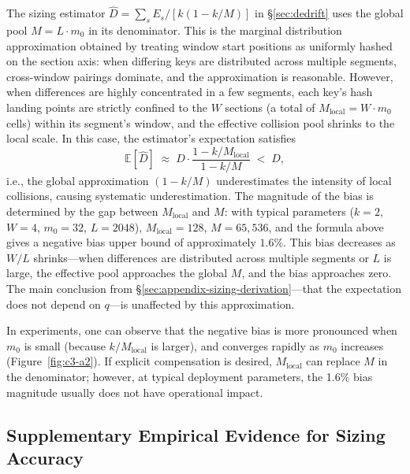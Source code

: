 The sizing estimator $\hat{D} = \sum_s E_s/[k(1-k/M)]$ in \S\ref{sec:dedrift} uses the global pool $M = L \cdot m_0$ in its denominator. This is the marginal distribution approximation obtained by treating window start positions as uniformly hashed on the section axis: when differing keys are distributed across multiple segments, cross-window pairings dominate, and the approximation is reasonable. However, when differences are highly concentrated in a few segments, each key's hash landing points are strictly confined to the $W$ sections (a total of $M_{\text{local}} = W \cdot m_0$ cells) within its segment's window, and the effective collision pool shrinks to the local scale. In this case, the estimator's expectation satisfies
\[
\mathbb{E}[\hat{D}] \;\approx\; D \cdot \frac{1 - k/M_{\text{local}}}{1 - k/M} \;<\; D,
\]
i.e., the global approximation $(1{-}k/M)$ underestimates the intensity of local collisions, causing systematic underestimation. The magnitude of the bias is determined by the gap between $M_{\text{local}}$ and $M$: with typical parameters ($k{=}2$, $W{=}4$, $m_0{=}32$, $L{=}2048$), $M_{\text{local}}{=}128$, $M{=}65{,}536$, and the formula above gives a negative bias upper bound of approximately $1.6\%$. This bias decreases as $W/L$ shrinks---when differences are distributed across multiple segments or $L$ is large, the effective pool approaches the global $M$, and the bias approaches zero. The main conclusion from \S\ref{sec:appendix-sizing-derivation}---that the expectation does not depend on $q$---is unaffected by this approximation.

In experiments, one can observe that the negative bias is more pronounced when $m_0$ is small (because $k/M_{\text{local}}$ is larger), and converges rapidly as $m_0$ increases (Figure~\ref{fig:c3-a2}). If explicit compensation is desired, $M_{\text{local}}$ can replace $M$ in the denominator; however, at typical deployment parameters, the 1.6\% bias magnitude usually does not have operational impact.


\subsection{Supplementary Empirical Evidence for Sizing Accuracy}
\label{sec:appendix-sizing-supp}

